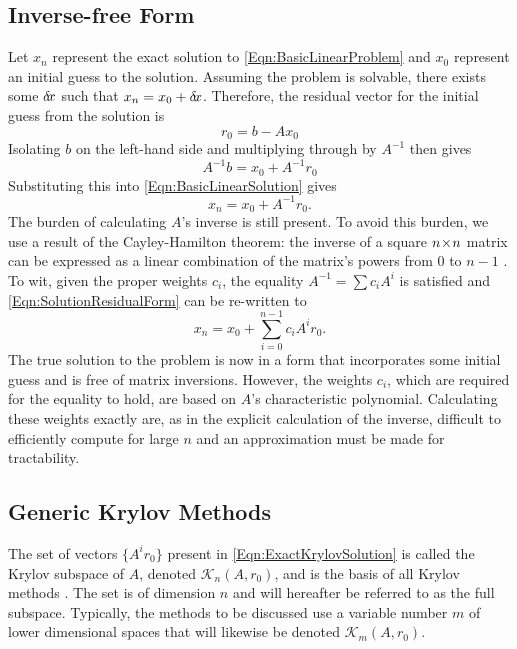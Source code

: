 \documentclass[12pt]{UWMadThesis}
\begin{document}
\subsection{Inverse-free Form}
Let $x_n$ represent the exact solution to \cref{Eqn:BasicLinearProblem} and $x_0$ represent an initial guess to the solution.
Assuming the problem is solvable, there exists some $\delta \mkern-3.00mu x$ such that $x_n = x_0 + \delta \mkern-3.00mu x$.
Therefore, the residual vector for the initial guess from the solution is
\begin{equation}
    r_0 = b - A x_0
    \label{Eqn:InitialResidual}
\end{equation}
Isolating $b$ on the left-hand side and multiplying through by $A^{-1}$ then gives
\begin{equation}
    A^{-1} b = x_0 + A^{-1} r_0
\end{equation}
Substituting this into \cref{Eqn:BasicLinearSolution} gives
\begin{equation}
    x_n = x_0 + A^{-1} r_0.
    \label{Eqn:SolutionResidualForm}
\end{equation}
The burden of calculating $A$'s inverse is still present.
To avoid this burden, we use a result of the Cayley-Hamilton theorem: the inverse of a square $n \!\times\! n$ matrix can be expressed as a linear combination of the matrix's powers from $0$ to $n-1$ \cite{rao_mathematical_2009}.
To wit, given the proper weights $c_i$, the equality $A^{-1} = \sum c_i A^i$ is satisfied and \cref{Eqn:SolutionResidualForm} can be re-written to
\begin{equation}
    x_n = x_0 + \sum_{i = 0}^{n-1} c_i A^i r_0.
    \label{Eqn:ExactKrylovSolution}
\end{equation}
The true solution to the problem is now in a form that incorporates some initial guess and is free of matrix inversions.
However, the weights $c_i$, which are required for the equality to hold, are based on $A$'s characteristic polynomial.
Calculating these weights exactly are, as in the explicit calculation of the inverse, difficult to efficiently compute for large $n$ and an approximation must be made for tractability.


\subsection{Generic Krylov Methods}

The set of vectors $\{A^i r_0\}$ present in \cref{Eqn:ExactKrylovSolution} is called the Krylov subspace of $A$, denoted $\mathcal{K}_n(A,r_0)$, and is the basis of all Krylov methods \cite{saad_iterative_2003}.
The set is of dimension $n$ and will hereafter be referred to as the full subspace.
Typically, the methods to be discussed use a variable number $m$ of lower dimensional spaces that will likewise be denoted $\mathcal{K}_m(A,r_0)$.
\end{document}
